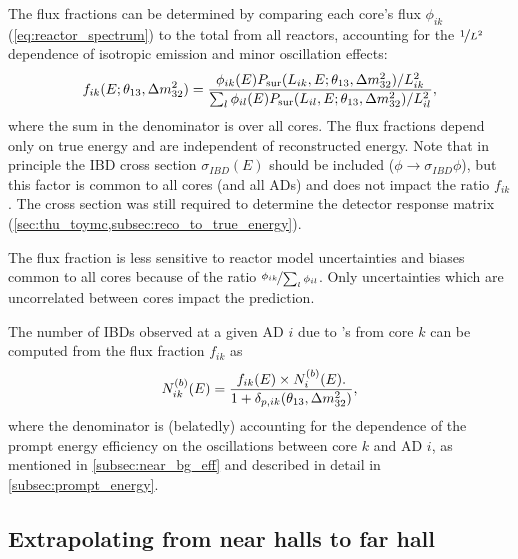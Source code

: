 The flux fractions can be determined
by comparing each core's \nuebar{} flux $\phi_{ik}$ (\cref{eq:reactor_spectrum})
to the total from all reactors,
accounting for the $\nicefrac{1}{L^2}$ dependence of isotropic \nuebar{} emission
and minor oscillation effects:
\begin{equation}\label{eq:flux_fraction}
    f_{ik}(E;\theta_{13},\Delta m^2_{32}) = \frac{
        \phi_{ik}(E) P_\text{sur} (L_{ik}, E;\theta_{13},\Delta m^2_{32})/L_{ik}^2
    }{
        \sum_l \phi_{il}(E)P_\text{sur}(L_{il}, E;\theta_{13},\Delta m^2_{32})/L_{il}^2
    },
\end{equation}
where the sum in the denominator is over all cores.
The flux fractions depend only on true \nuebar{} energy
and are independent of reconstructed energy.
Note that in principle the IBD cross section $\sigma_{IBD}(E)$
should be included ($\phi \to \sigma_{IBD}\phi$),
but this factor is common to all cores (and all ADs)
and does not impact the ratio $f_{ik}$.
The cross section was still required to determine the detector response matrix
(\cref{sec:thu_toymc,subsec:reco_to_true_energy}).

The flux fraction is less sensitive to reactor \nuebar{} model uncertainties and biases
common to all cores
because of the ratio $\nicefrac{\phi_{ik}}{\sum_l\phi_{il}}$.
Only uncertainties which are uncorrelated between cores
impact the prediction.

The number of IBDs observed at a given AD $i$ due to \nuebar{}'s from core $k$
can be computed from the flux fraction $f_{ik}$ as
\begin{equation}\label{eq:num_ibds_from_core_ij}
    N_{ik}^{(b)}(E) = \frac{
        f_{ik}(E) \times N_i^{(b)}(E).
    }{
        1 + \delta_{p,ik}(\theta_{13}, \Delta m^2_{32})
    },
\end{equation}
where the denominator is (belatedly) accounting for the dependence
of the prompt energy efficiency on the \nuebar{} oscillations
between core $k$ and AD $i$,
as mentioned in \cref{subsec:near_bg_eff}
and described in detail in \cref{subsec:prompt_energy}.

\subsection{Extrapolating from near halls to far hall}
\label{subsec:extrapolation}

